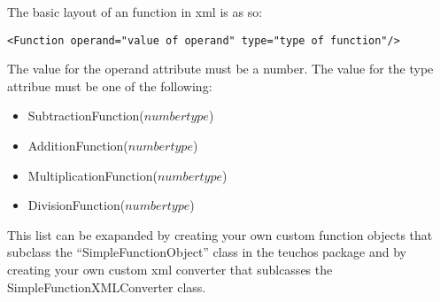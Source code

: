 The basic layout of an function in xml is as so:
\begin{Verbatim}[frame=single]
<Function operand="value of operand" type="type of function"/>
\end{Verbatim}
The value for the operand attribute must be a number. The value for the type attribue must be
one of the following:
\begin{itemize}
\item SubtractionFunction($number type$)
\item AdditionFunction($number type$)
\item MultiplicationFunction($number type$)
\item DivisionFunction($number type$)
\end{itemize}
This list can be exapanded by creating your own custom function objects that subclass the 
``SimpleFunctionObject'' class in the teuchos package and by creating your own custom
xml converter that sublcasses the SimpleFunctionXMLConverter class.


